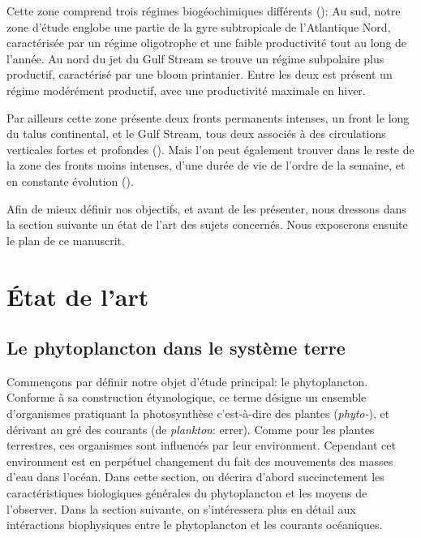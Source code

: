 Cette zone comprend trois régimes biogéochimiques différents (\cite{bock_2022}):
Au sud, notre zone d'étude englobe une partie de la gyre subtropicale de l'Atlantique Nord, caractérisée par un régime oligotrophe et une faible productivité tout au long de l'année.
Au nord du jet du Gulf Stream se trouve un régime subpolaire plus productif, caractérisé par une bloom printanier.
Entre les deux est présent un régime modérément productif, avec une productivité maximale en hiver.

Par ailleurs cette zone présente deux fronts permanents intenses, un front le long du talus continental, et le Gulf Stream, tous deux associés à des circulations verticales fortes et profondes (\cite{flagg_2006,liao_2022}).
Mais l'on peut également trouver dans le reste de la zone des fronts moins intenses, d'une durée de vie de l'ordre de la semaine, et en constante évolution (\cite{drushka_2019,sanchez-rios_2020}).

Afin de mieux définir nos objectifs, et avant de les présenter, nous dressons dans la section suivante un état de l'art des sujets concernés.
Nous exposerons ensuite le plan de ce manuscrit.

\section{État de l'art}
\label{sec:etat-de-lart}

\subsection{Le phytoplancton dans le système terre}
\label{sec:phyto-ds-sys-terre}


Commençons par définir notre objet d'étude principal: le phytoplancton.
Conforme à sa construction étymologique, ce terme désigne un ensemble d'organismes pratiquant la photosynthèse c'est-à-dire des plantes (\emph{phyto-}), et dérivant au gré des courants (de \emph{plankton}: errer).
Comme pour les plantes terrestres, ces organismes sont influencés par leur environment.
Cependant cet environment est en perpétuel changement du fait des mouvements des masses d'eau dans l'océan.
Dans cette section, on décrira d'abord succinctement les caractéristiques biologiques générales du phytoplancton et les moyens de l'observer.
Dans la section suivante, on s'intéressera plus en détail aux intéractions biophysiques entre le phytoplancton et les courants océaniques.

